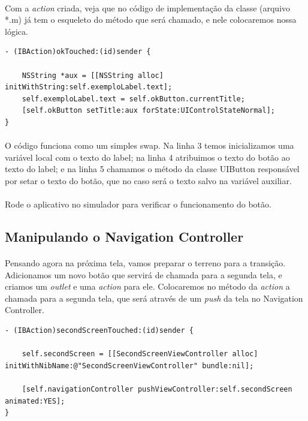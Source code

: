 \documentclass[a4paper,12pt,brazil,doubleside]{book}
\begin{document}
\paragraph{}Com a \emph{action} criada, veja que no código de implementação da classe (arquivo *.m) já tem o esqueleto do método que será chamado, e nele colocaremos nossa lógica.\\

\begin{lstlisting}
- (IBAction)okTouched:(id)sender {
    
    NSString *aux = [[NSString alloc] initWithString:self.exemploLabel.text];
    self.exemploLabel.text = self.okButton.currentTitle;
    [self.okButton setTitle:aux forState:UIControlStateNormal];
}
\end{lstlisting}

\paragraph{}O código funciona como um simples swap. Na linha 3 temos inicializamos uma variável local com o texto do label; na linha 4 atribuimos o texto do botão ao texto do label; e na linha 5 chamamos o método da classe UIButton responsável por setar o texto do botão, que no caso será o texto salvo na variável auxiliar.
\paragraph{}Rode o aplicativo no simulador para verificar o funcionamento do botão.\\

\bigskip

\subsection{Manipulando o Navigation Controller}

\paragraph{}Pensando agora na próxima tela, vamos preparar o terreno para a transição. Adicionamos um novo botão que servirá de chamada para a segunda tela, e criamos um \emph{outlet} e uma \emph{action} para ele. Colocaremos no método da \emph{action} a chamada para a segunda tela, que será através de um \emph{push} da tela no Navigation Controller.\\

\begin{lstlisting}
- (IBAction)secondScreenTouched:(id)sender {
    
    self.secondScreen = [[SecondScreenViewController alloc] initWithNibName:@"SecondScreenViewController" bundle:nil];
    
    [self.navigationController pushViewController:self.secondScreen animated:YES];
}
\end{lstlisting}
\end{document}
